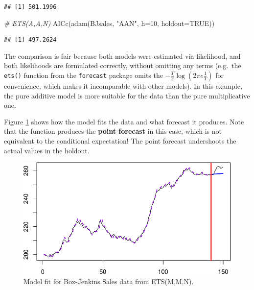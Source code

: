 \documentclass[
]{book}
\newenvironment{Shaded}{\begin{snugshade}}{\end{snugshade}}
\newcommand{\AttributeTok}[1]{\textcolor[rgb]{0.77,0.63,0.00}{#1}}
\newcommand{\CommentTok}[1]{\textcolor[rgb]{0.56,0.35,0.01}{\textit{#1}}}
\newcommand{\ConstantTok}[1]{\textcolor[rgb]{0.00,0.00,0.00}{#1}}
\newcommand{\DecValTok}[1]{\textcolor[rgb]{0.00,0.00,0.81}{#1}}
\newcommand{\FunctionTok}[1]{\textcolor[rgb]{0.00,0.00,0.00}{#1}}
\newcommand{\NormalTok}[1]{#1}
\newcommand{\StringTok}[1]{\textcolor[rgb]{0.31,0.60,0.02}{#1}}
\theoremstyle{definition}
\theoremstyle{definition}
\theoremstyle{definition}
\theoremstyle{definition}
\theoremstyle{remark}
\begin{document}
\begin{verbatim}
## [1] 501.1996
\end{verbatim}

\begin{Shaded}
\begin{Highlighting}[]
\CommentTok{\# ETS(A,A,N)}
\FunctionTok{AICc}\NormalTok{(}\FunctionTok{adam}\NormalTok{(BJsales, }\StringTok{"AAN"}\NormalTok{, }\AttributeTok{h=}\DecValTok{10}\NormalTok{, }\AttributeTok{holdout=}\ConstantTok{TRUE}\NormalTok{))}
\end{Highlighting}
\end{Shaded}

\begin{verbatim}
## [1] 497.2624
\end{verbatim}

The comparison is fair because both models were estimated via likelihood, and both likelihoods are formulated correctly, without omitting any terms (e.g.~the \texttt{ets()} function from the \texttt{forecast} package omits the \(-\frac{T}{2} \log\left(2\pi e \frac{1}{T}\right)\) for convenience, which makes it incomparable with other models). In this example, the pure additive model is more suitable for the data than the pure multiplicative one.

Figure \ref{fig:BJSalesadamETSMMN} shows how the model fits the data and what forecast it produces. Note that the function produces the \textbf{point forecast} in this case, which is not equivalent to the conditional expectation! The point forecast undershoots the actual values in the holdout.

\begin{figure}
\centering
\includegraphics{Svetunkov--2022----ADAM_files/figure-latex/BJSalesadamETSMMN-1.pdf}
\caption{\label{fig:BJSalesadamETSMMN}Model fit for Box-Jenkins Sales data from ETS(M,M,N).}
\end{figure}
\end{document}
